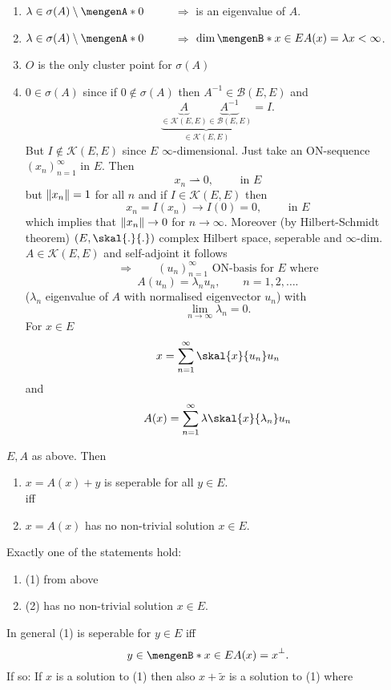 \begin{enumerate}
	\item $\lambda \in \sigma(A) \setminus \set{0}$ $\qquad $ $\Rightarrow$ is an eigenvalue of $A$. 
	\item $\lambda \in \sigma(A) \setminus \set{0}$ $\qquad $ $\Rightarrow $ $\dim \set[x \in E]{A(x) = \lambda x} < \infty$.
	\item $O$ is the only cluster point for $\sigma(A)$ 
	\item $0 \in \sigma(A)$ since if $0 \not \in \sigma(A)$ then $A^{-1} \in \mathcal{B}(E,E)$ and \[
		\underset{\in \mathcal{K}(E,E)}{\underbrace{\underset{\in \mathcal{K}(E,E)}{\underbrace{A}} \underset{\in \mathcal{B}(E,E)}{\underbrace{A^{-1}}}}} = I.
	\]
	But $I \not \in \mathcal{K}(E,E)$ since $E$ $\infty$-dimensional. Just take an ON-sequence $(x_n)_{n=1}^{\infty}$ in $E$. Then \[
		x_n \rightharpoonup 0, \qquad \text{ in }E
	\]
	but $\norm{x_n}=1$ for all $n$ and if $I \in \mathcal{K}(E,E)$ then 
	\[
		x_n = I(x_n) \to I(0) = 0, \qquad  \text{ in }E
	\]
	which implies that $\norm{x_n}\to 0$ for $n \to \infty$. Moreover (by Hilbert-Schmidt theorem) $(E, \skal{.}{.})$ complex Hilbert space, seperable and $\infty$-dim. $A \in \mathcal{K}(E,E)$ and self-adjoint it follows
	\[
		\Rightarrow \qquad (u_n)_{n=1}^{\infty} \text{ ON-basis for $E$ where}
	\]
	\[
		A(u_n) = \lambda_n u_n, \qquad n=1,2,\dots.
	\]
	($\lambda_n$ eigenvalue of $A$ with normalised eigenvector $u_n$) with
	\[
		\lim_{n \to \infty}\lambda_n = 0.
	\]
	For $x \in E$
	\[
		x = \sum_{n=1}^{\infty} \skal{x}{u_n}u_n
	\]
	and
	\[
		A(x) = \sum_{n=1}^{\infty}\lambda \skal{x}{\lambda_n}u_n
	\]
\end{enumerate}
$E,A$ as above. Then
\begin{enumerate}
	\item $x = A(x) + y$ is seperable for all $y \in E$. \\
	iff
	\item $x = A(x)$ has no non-trivial solution $x \in E$.
\end{enumerate}
Exactly one of the statements hold:
\begin{enumerate}
	\item (1) from above
	\item (2) has no non-trivial solution $x \in E$.
\end{enumerate}
In general (1) is seperable for $y \in E$ iff 
\[
	y \in \set[x \in E]{A(x)=x}^{\perp}.
\]
If so: If $x$ is a solution to (1) then also $x + \tilde x$ is a solution to (1) where
